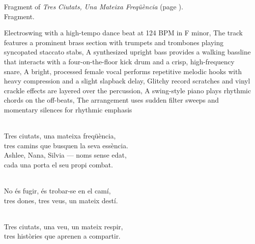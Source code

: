 
\begin{notes}
Fragment of \emph{Tres Ciutats, Una Mateixa Freqüència} (page \pageref{sec:tres-ciutats-una-mateixa-frequencia}).\\
Fragment.
\end{notes}
\begin{style}
Electroswing with a high-tempo dance beat at 124 BPM in F minor, The track features a prominent brass section with trumpets and trombones playing syncopated staccato stabs, A synthesized upright bass provides a walking bassline that interacts with a four-on-the-floor kick drum and a crisp, high-frequency snare, A bright, processed female vocal performs repetitive melodic hooks with heavy compression and a slight slapback delay, Glitchy record scratches and vinyl crackle effects are layered over the percussion, A swing-style piano plays rhythmic chords on the off-beats, The arrangement uses sudden filter sweeps and momentary silences for rhythmic emphasis
\end{style}
\begin{lyrics}
\\
Tres ciutats, una mateixa freqüència,
\\
tres camins que busquen la seva essència.
\\
Ashlee, Nana, Silvia — noms sense edat,\\
cada una porta el seu propi combat.

\\
No és fugir, és trobar-se en el camí,\\
tres dones, tres veus, un mateix destí.

\\
Tres ciutats, una veu, un mateix respir,\\
tres històries que aprenen a compartir.
\end{lyrics}


